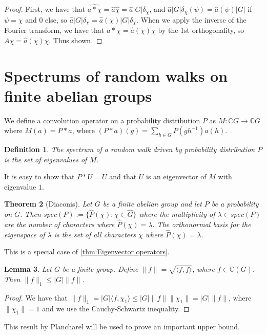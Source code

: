 \documentclass[]{article}
\newtheorem{theorem}{Theorem}
\newtheorem{lemma}[theorem]{Lemma}
\newtheorem{definition}[theorem]{Definition}
\theoremstyle{definition}
\numberwithin{theorem}{section}
\numberwithin{equation}{section}
\begin{document}
\begin{proof}
	First, we have that $\widehat{a\ast \chi} = \widehat{a} \widehat{\chi} = \widehat{a} |G| \delta_\chi$, and $\widehat{a} |G| \delta_\chi(\psi) = \widehat{a}(\psi) |G|$ if $\psi = \chi$ and 0 else, so $\widehat{a} |G| \delta_\chi = \widehat{a}(\chi) |G| \delta_\chi$. When we apply the inverse of the Fourier transform, we have that $a \ast \chi = \widehat{a}(\chi) \chi$ by the 1st orthogonality, so $A \chi = \widehat{a}(\chi) \chi$. Thus shown. 
\end{proof}

\section{Spectrums of random walks on finite abelian groups}
We define a convolution operator on a probability distribution $P$ as $M : \mathbb{C}G \rightarrow \mathbb{C}G$ where $M(a) = P \ast a$, where $(P \ast a) (g) =\sum_{h\in G} P(gh^{-1})a(h)$.
\begin{definition}
	The spectrum of a random walk driven by probability distribution $P$ is the set of eigenvalues of $M$. 
\end{definition} 
It is easy to show that $P \ast U = U$ and that $U$ is an eigenvector of $M$ with eigenvalue $1$. 


\begin{theorem}[Diaconis]
	\label{thm:Diaconis}
	Let $G$ be a finite abelian group and let $P$ be a probability on $G$. Then $spec(P) := \lbrace \widehat{P}(\chi) : \chi \in \widehat{G} \rbrace$ where the multiplicity of $\lambda \in spec(P)$ are the number of characters where $\widehat{P}(\chi) = \lambda$. The orthonormal basis for the eigenspace of $\lambda$ is the set of all characters $\chi$ where $\widehat{P}(\chi) = \lambda$. 
\end{theorem}
This is a special case of \cref{thm:Eigenvector operators}.

\begin{lemma}
	\label{lem:Absolute Value Inequality}
	Let $G$ be a finite group. Define $\|f\| = \sqrt{\langle f, f \rangle}$, where $f \in \mathbb{C}(G)$. Then $\|f \|_1 \leq |G| \|f \|$.
\end{lemma}
\begin{proof}
	We have that $\|f \|_1 = |G| \langle f, \chi_1 \rangle \leq |G| \|f \| \|\chi_1 \| = |G| \|f \|$, where $\|\chi_1 \| = 1$ and we use the Cauchy-Schwartz inequality. 
\end{proof}

This result by Plancharel will be used to prove an important upper bound. 
\end{document}
